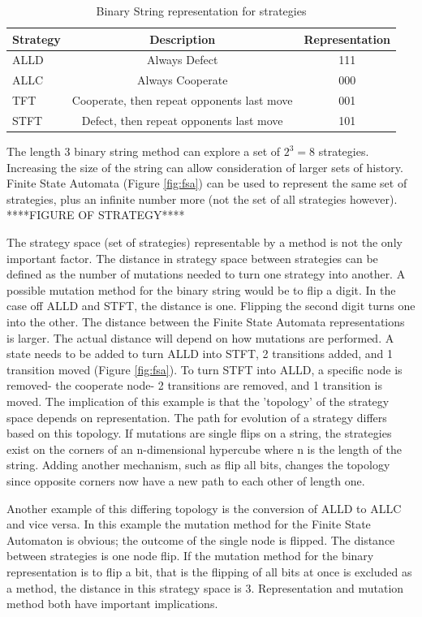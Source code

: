 \documentclass[a4paper,11pt,bcshonoursthesis,singlespace,twoside]{cssethesis}
\begin{document}
\begin{table}[h]
\centering
\captionsetup{justification=centering}
\begin{tabular}{|l|c|c|}
\hline
 Strategy & Description & Representation\\
\hline
ALLD & Always Defect & 111\\
\hline
ALLC & Always Cooperate & 000\\
\hline
TFT & Cooperate, then repeat opponents last move & 001\\
\hline
STFT & Defect, then repeat opponents last move & 101\\
\hline
\end{tabular}
\caption{Binary String representation for strategies}
\label{table:binaryStrategy}
\end{table}

The length 3 binary string method can explore a set of $2^3=8$ strategies. Increasing the size of the string can allow consideration of larger sets of history. 
Finite State Automata (Figure \ref{fig:fsa}) can be used to represent the same set of strategies, plus an infinite number more (not the set of all strategies however).
****FIGURE OF STRATEGY****

The strategy space (set of strategies) representable by a method is not the only important factor. 
The distance in strategy space between strategies can be defined as the number of mutations needed to turn one strategy into another. 
A possible mutation method for the binary string would be to flip a digit. 
In the case off ALLD and STFT, the distance is one. Flipping the second digit turns one into the other. 
The distance between the Finite State Automata representations is larger. 
The actual distance will depend on how mutations are performed. 
A state needs to be added to turn ALLD into STFT, 2 transitions added, and 1 transition moved (Figure \ref{fig:fsa}). 
To turn STFT into ALLD, a specific node is removed- the cooperate node- 2 transitions are removed, and 1 transition is moved. 
The implication of this example is that the 'topology' of the strategy space depends on representation. 
The path for evolution of a strategy differs based on this topology. 
If mutations are single flips on a string, the strategies exist on the corners of an n-dimensional hypercube where n is the length of the string. 
Adding another mechanism, such as flip all bits, changes the topology since opposite corners now have a new path to each other of length one.

Another example of this differing topology is the conversion of ALLD to ALLC and vice versa. 
In this example the mutation method for the Finite State Automaton is obvious; the outcome of the single node is flipped. 
The distance between strategies is one node flip. 
If the mutation method for the binary representation is to flip a bit, that is the flipping of all bits at once is excluded as a method, the distance in this strategy space is 3. 
Representation and mutation method both have important implications.
\end{document}
